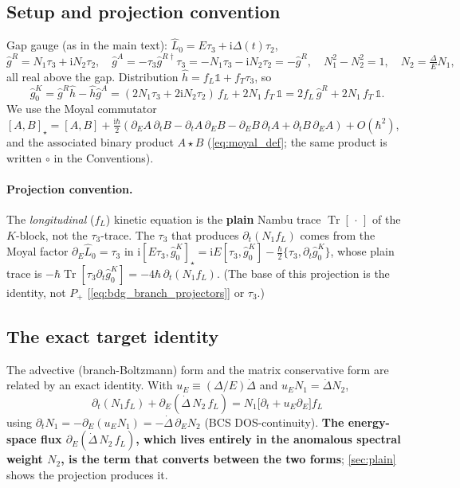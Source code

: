 \documentclass[
  aps,
  prb,
  preprint,
  superscriptaddress,
  longbibliography,
  nofootinbib
]{revtex4-2}
\newcommand{\ii}{\mathrm{i}}
\newcommand{\Tr}{\operatorname{Tr}}
\newcommand{\DOS}{N_1}
\newcommand{\fL}{f_L}
\newcommand{\fT}{f_T}
\newcommand{\hatg}{\hat{g}}
\providecommand{\openone}{}\renewcommand{\openone}{\mathds{1}}
\begin{document}
\subsection{Setup and projection convention}
\label{sec:setup}

Gap gauge (as in the main text): $\hat L_0=E\tau_3+\ii\Delta(t)\tau_2$,
\begin{equation}
  \hatg^{R}=\DOS\tau_3+\ii N_2\tau_2,\quad
  \hatg^{A}=-\tau_3\hatg^{R\dagger}\tau_3=-\DOS\tau_3-\ii N_2\tau_2=-\hatg^{R},\quad
  \DOS^2-N_2^2=1,\quad N_2=\tfrac{\Delta}{E}\DOS,
  \label{eq:gRA}
\end{equation}
all real above the gap. Distribution $\hat h=\fL\openone+\fT\tau_3$, so
\begin{equation}
  \hatg_0^K=\hatg^{R}\hat h-\hat h\hatg^{A}
  =(2\DOS\tau_3+2\ii N_2\tau_2)\,\fL+2\DOS\,\fT\,\openone
  =2\fL\,\hatg^{R}+2\DOS\,\fT\,\openone .
  \label{eq:gK}
\end{equation}
We use the Moyal commutator
$[A,B]_\star=[A,B]+\tfrac{\ii\hbar}{2}(\partial_EA\,\partial_tB-\partial_tA\,\partial_EB
-\partial_EB\,\partial_tA+\partial_tB\,\partial_EA)+O(\hbar^2)$,
and the associated binary product $A\star B$ (\cref{eq:moyal_def}; the
same product is written $\circ$ in the Conventions).

\paragraph{Projection convention.} The \emph{longitudinal} ($\fL$) kinetic equation is the
\textbf{plain} Nambu trace $\Tr[\,\cdot\,]$ of the $K$-block, not the
$\tau_3$-trace. The $\tau_3$ that produces $\partial_t(\DOS\fL)$ comes from the
Moyal factor $\partial_E\hat L_0=\tau_3$ in $\ii[E\tau_3,\hatg_0^K]_\star
=\ii E[\tau_3,\hatg_0^K]-\tfrac{\hbar}{2}\{\tau_3,\partial_t\hatg_0^K\}$, whose
plain trace is $-\hbar\Tr[\tau_3\partial_t\hatg_0^K]=-4\hbar\,\partial_t(\DOS\fL)$.
(The base of this projection is the identity, not $P_+$
[\cref{eq:bdg_branch_projectors}] or $\tau_3$.)

\subsection{The exact target identity}
\label{sec:exact}

The advective (branch-Boltzmann) form and the matrix conservative form are
related by an exact identity. With $u_E\equiv(\Delta/E)\dot\Delta$ and
$u_E\DOS=\dot\Delta N_2$,
\begin{equation}
  \boxed{\;
  \partial_t(\DOS\fL)+\partial_E(\dot\Delta\,N_2\,\fL)
  =\DOS\bigl[\partial_t+u_E\partial_E\bigr]\fL\;}
  \label{eq:exact}
\end{equation}
using $\partial_t\DOS=-\partial_E(u_E\DOS)=-\dot\Delta\,\partial_EN_2$ (BCS
DOS-continuity). \textbf{The energy-space flux
$\partial_E(\dot\Delta\,N_2\,\fL)$, which lives entirely in the anomalous
spectral weight $N_2$, is the term that converts between the two forms};
\cref{sec:plain} shows the projection produces it.
\end{document}
